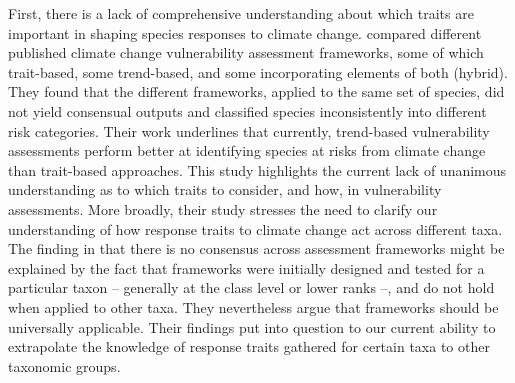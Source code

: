First, there is a lack of comprehensive understanding about which traits are important in shaping species responses to climate change. \citet{Wheatley2017} compared different published climate change vulnerability assessment frameworks, some of which trait-based, some trend-based, and some incorporating elements of both (hybrid). They found that the different frameworks, applied to the same set of species, did not yield consensual outputs and classified species inconsistently into different risk categories. Their work underlines that currently, trend-based vulnerability assessments perform better at identifying species at risks from climate change than trait-based approaches. This study highlights the current lack of unanimous understanding as to which traits to consider, and how, in vulnerability assessments. More broadly, their study stresses the need to clarify our understanding of how response traits to climate change act across different taxa. The finding in \citet{Wheatley2017} that there is no consensus across assessment frameworks might be explained by the fact that frameworks were initially designed and tested for a particular taxon -- generally at the class level or lower ranks --, and do not hold when applied to other taxa. They nevertheless argue that frameworks should be universally applicable. Their findings put into question to our current ability to extrapolate the knowledge of response traits gathered for certain taxa to other taxonomic groups. 


